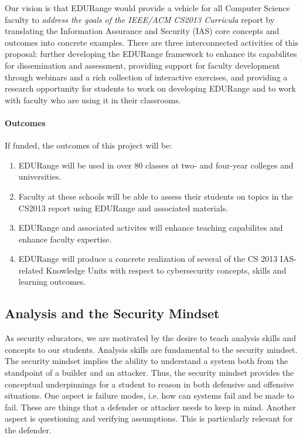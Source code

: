 
Our vision is that EDURange would provide a vehicle for all Computer Science faculty 
to {\em address the goals of the IEEE/ACM CS2013 Curricula} report by translating 
the Information Assurance and Security (IAS) core concepts and outcomes into
concrete examples.  There are three interconnected activities of this proposal: further 
developing the
EDURange framework to enhance its capabilites for dissemination and assessment, 
providing support for faculty development
through webinars and a rich collection of interactive exercises, and providing a research 
opportunity for students to work on developing 
EDURange and to work
with faculty who are using it in their classrooms.
\paragraph{Outcomes}
If funded, the outcomes of this project will be:
\begin{enumerate}
\item EDURange will be used in over 80 classes at two- and four-year colleges and universities.
\item Faculty at these schools will be able to assess their students on topics in the CS2013 report using EDURange and 
  associated materials.
\item EDURange and associated activites will enhance teaching capabilites and enhance faculty expertise.
\item EDURange will produce a concrete realization of several of the CS 2013 IAS-related Knowledge Units
  with respect to cybersecurity concepts, skills and learning outcomes.
\end{enumerate}



\subsection{Analysis and the Security Mindset}
As security educators, we are motivated by the desire to teach analysis skills and concepts
to our students.
Analysis skills are fundamental to the security mindset.  The security
mindset implies the ability to understand a system both from the
standpoint of a builder and an attacker.  Thus, the security mindset
provides the conceptual underpinnings for a student to reason in both
defensive and offensive situations.  One aspect is failure modes,
i.e. how can systems fail and be made to fail.  These are things that
a defender or attacker needs to keep in mind.  Another aspect is
questioning and verifying assumptions.  This is particularly relevant
for the defender.


